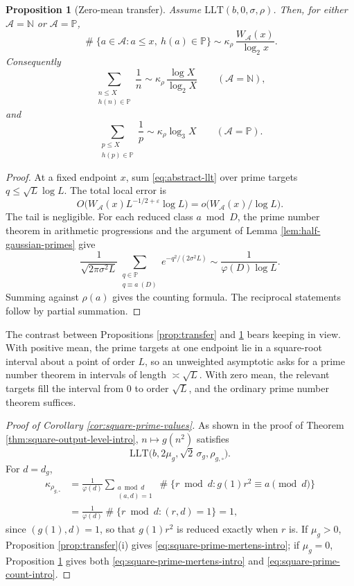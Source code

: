 \documentclass[11pt,reqno]{amsart}
\theoremstyle{plain}
\newtheorem{proposition}[theorem]{Proposition}
\theoremstyle{definition}
\newcommand{\N}{\mathbb{N}}
\newcommand{\Pp}{\mathbb{P}}
\newcommand{\eps}{\varepsilon}
\newcommand{\1}{\mathbf 1}
\DeclareMathOperator{\Card}{\#}
\begin{document}
\begin{proposition}[Zero-mean transfer]\label{prop:zero-transfer}
Assume $\mathrm{LLT}(b,0,\sigma,\rho)$.  Then, for either $\mathcal A=\N$ or $\mathcal A=\Pp$,
\[
 \Card\{a\in\mathcal A:a\le x,\ h(a)\in\Pp\}
 \sim \kappa_\rho\,\frac{W_{\mathcal A}(x)}{\log_2x}.
\]
Consequently
\[
 \sum_{\substack{n\le X\\h(n)\in\Pp}}\frac1n
 \sim \kappa_\rho\,\frac{\log X}{\log_2X}
 \qquad(\mathcal A=\N),
\]
and
\[
 \sum_{\substack{p\le X\\h(p)\in\Pp}}\frac1p
 \sim \kappa_\rho\log_3X
 \qquad(\mathcal A=\Pp).
\]
\end{proposition}

\begin{proof}
At a fixed endpoint $x$, sum \eqref{eq:abstract-llt} over prime targets $q\le \sqrt L\log L$.  The total local error is
\[
 O\big(W_{\mathcal A}(x)L^{-1/2+\eps}\log L\big)
 =o\big(W_{\mathcal A}(x)/\log L\big).
\]
The tail is negligible.  For each reduced class $a\bmod D$, the prime number theorem in arithmetic progressions and the argument of Lemma \ref{lem:half-gaussian-primes} give
\[
 \frac1{\sqrt{2\pi\sigma^2L}}
 \sum_{\substack{q\in\Pp\\q\equiv a\ (D)}}e^{-q^2/(2\sigma^2L)}
 \sim\frac1{\varphi(D)\log L}.
\]
Summing against $\rho(a)$ gives the counting formula.  The reciprocal statements follow by partial summation.
\end{proof}

The contrast between Propositions \ref{prop:transfer} and \ref{prop:zero-transfer} bears keeping in view.  With positive mean, the prime targets at one endpoint lie in a square-root interval about a point of order $L$, so an unweighted asymptotic asks for a prime number theorem in intervals of length $\asymp\sqrt L$.  With zero mean, the relevant targets fill the interval from $0$ to order $\sqrt L$, and the ordinary prime number theorem suffices.

\begin{proof}[Proof of Corollary \ref{cor:square-prime-values}]
As shown in the proof of Theorem \ref{thm:square-output-level-intro}, $n\mapsto g(n^2)$ satisfies
\[
 \mathrm{LLT}\bigl(b,2\mu_g,\sqrt2\,\sigma_g,\rho_{g,\square}\bigr).
\]
For $d=d_g$,
\begin{align*}
 \kappa_{\rho_{g,\square}}
 &=\frac1{\varphi(d)}
 \sum_{\substack{a\bmod d\\(a,d)=1}}
 \Card\{r\bmod d:g(1)r^2\equiv a\pmod d\}\\
 &=\frac1{\varphi(d)}\Card\{r\bmod d:(r,d)=1\}=1,
\end{align*}
since $(g(1),d)=1$, so that $g(1)r^2$ is reduced exactly when $r$ is.  If $\mu_g>0$, Proposition \ref{prop:transfer}(i) gives \eqref{eq:square-prime-mertens-intro}; if $\mu_g=0$, Proposition \ref{prop:zero-transfer} gives both \eqref{eq:square-prime-mertens-intro} and \eqref{eq:square-prime-count-intro}.
\end{proof}
\end{document}
